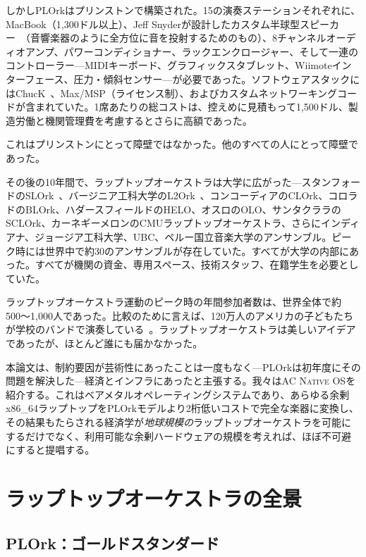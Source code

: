 \documentclass[10pt,letterpaper,twocolumn]{article}
\newcommand{\acos}{\textsc{AC Native OS}}
\begin{document}
しかしPLOrkはプリンストンで構築された。15の演奏ステーションそれぞれに、MacBook（1,300ドル以上）、Jeff Snyderが設計したカスタム半球型スピーカー~\citep{snyder2015hemispherical}（音響楽器のように全方位に音を投射するためのもの）、8チャンネルオーディオアンプ、パワーコンディショナー、ラックエンクロージャー、そして一連のコントローラー---MIDIキーボード、グラフィックスタブレット、Wiimoteインターフェース、圧力・傾斜センサー---が必要であった。ソフトウェアスタックにはChucK~\citep{wang2003chuck}、Max/MSP（ライセンス制）、およびカスタムネットワーキングコードが含まれていた。1席あたりの総コストは、控えめに見積もって1,500ドル、製造労働と機関管理費を考慮するとさらに高額であった。

これはプリンストンにとって障壁ではなかった。他のすべての人にとって障壁であった。

その後の10年間で、ラップトップオーケストラは大学に広がった---スタンフォードのSLOrk~\citep{wang2009designing}、バージニア工科大学のL2Ork~\citep{bukvic2010l2ork}、コンコーディアのCLOrk、コロラドのBLOrk、ハダースフィールドのHELO、オスロのOLO、サンタクララのSCLOrk、カーネギーメロンのCMUラップトップオーケストラ、さらにインディアナ、ジョージア工科大学、UBC、ペルー国立音楽大学のアンサンブル。ピーク時には世界中で約30のアンサンブルが存在していた。すべてが大学の内部にあった。すべてが機関の資金、専用スペース、技術スタッフ、在籍学生を必要としていた。

ラップトップオーケストラ運動のピーク時の年間参加者数は、世界全体で約500〜1,000人であった。比較のために言えば、120万人のアメリカの子どもたちが学校のバンドで演奏している~\citep{warschauer2004technology}。ラップトップオーケストラは美しいアイデアであったが、ほとんど誰にも届かなかった。

本論文は、制約要因が芸術性にあったことは一度もなく---PLOrkは初年度にその問題を解決した---経済とインフラにあったと主張する。我々は\acos{}を紹介する。これはベアメタルオペレーティングシステムであり、あらゆる余剰x86\_64ラップトップをPLOrkモデルより2桁低いコストで完全な楽器に変換し、その結果もたらされる経済学が\emph{地球規模の}ラップトップオーケストラを可能にするだけでなく、利用可能な余剰ハードウェアの規模を考えれば、ほぼ不可避にすると提唱する。


\section{ラップトップオーケストラの全景}
\label{sec:landscape}

\subsection{PLOrk：ゴールドスタンダード}
\end{document}
